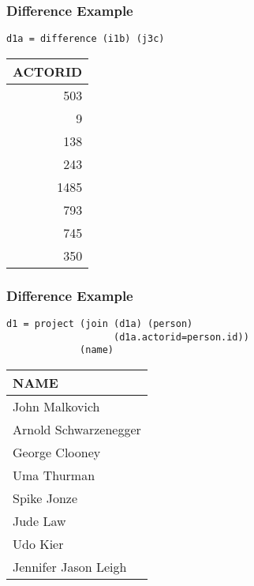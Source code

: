 \documentclass[dvipsnames]{beamer}
\theoremstyle{plain}
\begin{document}
\begin{frame}[fragile]
  \frametitle{Difference Example}

  \begin{example}
    \begin{lstlisting}
d1a = difference (i1b) (j3c)
    \end{lstlisting}

    \pause
    \begin{tiny}
    \begin{table}
      \begin{tabular}{|r|}\hline
ACTORID\\\hline\hline
    503\\\hline
      9\\\hline
    138\\\hline
    243\\\hline
   1485\\\hline
    793\\\hline
    745\\\hline
    350\\\hline
      \end{tabular}
    \end{table}
    \end{tiny}
  \end{example}
\end{frame}

\begin{frame}[fragile]
  \frametitle{Difference Example}

  \begin{example}
    \begin{lstlisting}
d1 = project (join (d1a) (person)
                   (d1a.actorid=person.id))
             (name)
    \end{lstlisting}

    \pause
    \begin{tiny}
    \begin{table}
      \begin{tabular}{|l|}\hline
NAME                 \\\hline\hline
John Malkovich       \\\hline
Arnold Schwarzenegger\\\hline
George Clooney       \\\hline
Uma Thurman          \\\hline
Spike Jonze          \\\hline
Jude Law             \\\hline
Udo Kier             \\\hline
Jennifer Jason Leigh \\\hline
      \end{tabular}
    \end{table}
    \end{tiny}
  \end{example}
\end{frame}
\end{document}
